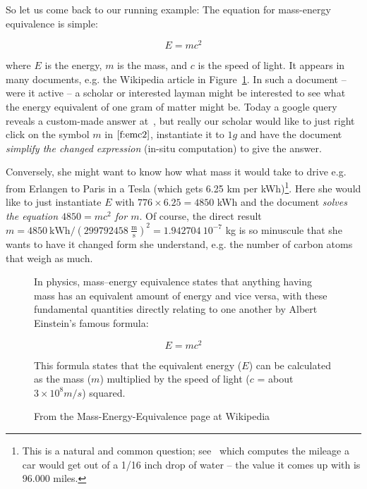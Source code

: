 So let us come back to our running example: The equation for mass-energy equivalence is
simple:

\begin{equation}\label{f:emc2}
  E=mc^2
\end{equation}

where $E$ is the energy, $m$ is the mass, and $c$ is the speed of light. It appears in
many documents, e.g. the Wikipedia article in Figure~\ref{fig:emc2-wikipedia}. In such a
document -- were it active -- a scholar or interested layman might be interested to see
what the energy equivalent of one gram of matter might be. Today a google query reveals a
custom-made answer at~\cite{Odenwald:q388}, but really our scholar would like to just right
click on the symbol $m$ in $\ref{f:emc2}$, instantiate it to $1g$ and have the document
\emph{simplify the changed expression} (in-situ computation) to give the answer.

Conversely, she might want to know how what mass it would take to drive e.g. from Erlangen
to Paris in a Tesla (which gets 6.25 km per kWh)\footnote{This is a natural and common
  question; see~\cite{RT:emc2} which computes the mileage a car would get out of a 1/16
  inch drop of water -- the value it comes up with is 96.000 miles.}. Here she would like
to just instantiate $E$ with $776 \times 6.25=4850$ kWh and the document \emph{solves the
  equation $4850=mc^2$ for $m$}. Of course, the direct result
  $m = 4850\ \mbox{kWh} / (299792458\ \frac{\mbox{m}}{\mbox{s}})^2 = 1.942704 \ 10^{-7}$
 kg is so minuscule that she wants to have it changed form she understand, e.g. the number
 of carbon atoms that weigh as much.

\begin{figure}\centering
  \begin{boxedquote}
    In physics, mass–energy equivalence states that anything having mass has an equivalent
    amount of energy and vice versa, with these fundamental quantities directly relating
    to one another by Albert Einstein's famous formula:

    \[E=mc^2\]

    This formula states that the equivalent energy ($E$) can be calculated as the mass ($m$)
    multiplied by the speed of light ($c$ = about $3\times10^8 m/s$) squared.
  \end{boxedquote}
  \caption{From the Mass-Energy-Equivalence page at Wikipedia~\cite{WP:emc2}}
  \label{fig:emc2-wikipedia}
\end{figure}

